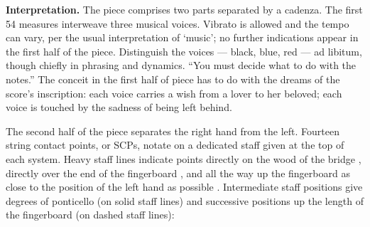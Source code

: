 \newcommand*\circled[1]{\tikz[baseline=(char.base)]{
            \node[shape=circle,draw,inner sep=2pt] (char) {#1};}}

\textbf{Interpretation.} The piece comprises two parts separated by a cadenza.
The first 54 measures interweave three musical voices. Vibrato is allowed and
the tempo can vary, per the usual interpretation of `music'; no further
indications appear in the first half of the piece. Distinguish the voices ---
black, blue, red --- ad libitum, though chiefly in phrasing and dynamics. ``You
must decide what to do with the notes.'' The conceit in the first half of piece
has to do with the dreams of the score's inscription: each voice carries a wish
from a lover to her beloved; each voice is touched by the sadness of being left
behind.

The second half of the piece separates the right hand from the left. Fourteen
string contact points, or SCPs, notate on a dedicated staff given at the top of
each system. Heavy staff lines indicate points directly on the wood
of the bridge
\raisebox{0.125 em}{\scalebox{0.375}{\circled{OB}}},
directly over the end of the
fingerboard
\raisebox{0.125 em}{\scalebox{0.375}{\circled{T0}}},
and all the way up the fingerboard as
close to the position of the left hand as possible
\raisebox{0.125 em}{\scalebox{0.375}{\circled{T+}}}.
Intermediate staff positions give degrees of
ponticello (on solid staff lines) and successive positions up the length of the
fingerboard (on dashed staff lines):
